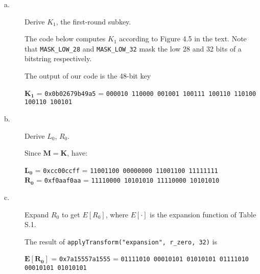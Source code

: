 \documentclass[../hw_sols.tex]{subfiles}
\begin{document}
\begin{description}

\item[a.] Derive $K_1$, the first-round subkey.

\begin{solution}

The code below computes $K_1$ according to Figure 4.5 in the text. Note that 
\verb|MASK_LOW_28| and \verb|MASK_LOW_32| mask the low 28 and 32 bits of a 
bitstring respectively.



The output of our code is the 48-bit key
\begin{center}
	$\mathbf{K_1}$ 
	= \verb|0x0b02679b49a5|
	= \verb|000010 110000 001001 100111 100110 110100 100110 100101|
\end{center}	

\end{solution}

\item[b.] Derive $L_0$, $R_0$.

\begin{solution}

Since $\mathbf{M} = \mathbf{K}$, have:



\begin{center}
	$\mathbf{L_0}$ 
	= \verb|0xcc00ccff| 
	= \verb|11001100 00000000 11001100 11111111| \\
	$\mathbf{R_0}$ 
	= \verb|0xf0aaf0aa| 
	= \verb|11110000 10101010 11110000 10101010|
\end{center}

\end{solution}

\item[c.] Expand $R_0$ to get $E[R_0]$, where $E[\cdot]$ is the expansion 
function of Table S.1.

\begin{solution}
The result of \verb|applyTransform("expansion", r_zero, 32)| is
\begin{center}
	$\mathbf{E[R_0]}$ 
	= \verb|0x7a15557a1555|
	= \verb|01111010 00010101 01010101 01111010 00010101 01010101|
\end{center}
\end{solution}



\end{description}
\end{document}
